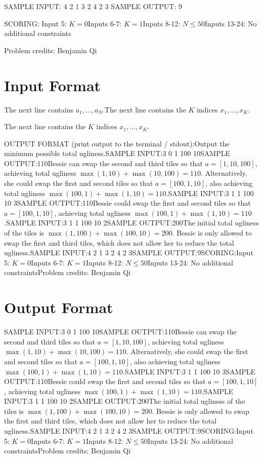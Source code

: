 \documentclass[12pt]{article}
\begin{document}
SAMPLE INPUT:
4 2
1 3 2 4
2 3
SAMPLE OUTPUT: 
9

SCORING:
Input 5: $K=0$Inputs 6-7: $K=1$Inputs 8-12: $N\le 50$Inputs 13-24: No additional constraints

Problem credits: Benjamin Qi



\section*{Input Format}
The next line contains $a_1,\dots,a_N$.The next line contains the $K$ indices $x_1,\dots,x_K$.

The next line contains the $K$ indices $x_1,\dots,x_K$.

OUTPUT FORMAT (print output to the terminal / stdout):Output the minimum possible total ugliness.SAMPLE INPUT:3 0
1 100 10SAMPLE OUTPUT:110Bessie can swap the second and third tiles so that $a=[1,10,100]$, achieving
total ugliness $\max(1,10)+\max(10,100)=110$. Alternatively, she could swap the
first and second tiles so that $a=[100,1,10]$, also achieving  total ugliness
$\max(100,1)+\max(1,10)=110$.SAMPLE INPUT:3 1
1 100 10
3SAMPLE OUTPUT:110Bessie could swap the first and second tiles so that $a=[100,1,10]$, achieving 
total ugliness $\max(100,1)+\max(1,10)=110$.SAMPLE INPUT:3 1
1 100 10
2SAMPLE OUTPUT:200The initial total ugliness of the tiles is $\max(1,100)+\max(100,10)=200$.
Bessie is only allowed to swap the first and third tiles, which does not allow
her to reduce the total ugliness.SAMPLE INPUT:4 2
1 3 2 4
2 3SAMPLE OUTPUT:9SCORING:Input 5: $K=0$Inputs 6-7: $K=1$Inputs 8-12: $N\le 50$Inputs 13-24: No additional constraintsProblem credits: Benjamin Qi

\section*{Output Format}
SAMPLE INPUT:3 0
1 100 10SAMPLE OUTPUT:110Bessie can swap the second and third tiles so that $a=[1,10,100]$, achieving
total ugliness $\max(1,10)+\max(10,100)=110$. Alternatively, she could swap the
first and second tiles so that $a=[100,1,10]$, also achieving  total ugliness
$\max(100,1)+\max(1,10)=110$.SAMPLE INPUT:3 1
1 100 10
3SAMPLE OUTPUT:110Bessie could swap the first and second tiles so that $a=[100,1,10]$, achieving 
total ugliness $\max(100,1)+\max(1,10)=110$.SAMPLE INPUT:3 1
1 100 10
2SAMPLE OUTPUT:200The initial total ugliness of the tiles is $\max(1,100)+\max(100,10)=200$.
Bessie is only allowed to swap the first and third tiles, which does not allow
her to reduce the total ugliness.SAMPLE INPUT:4 2
1 3 2 4
2 3SAMPLE OUTPUT:9SCORING:Input 5: $K=0$Inputs 6-7: $K=1$Inputs 8-12: $N\le 50$Inputs 13-24: No additional constraintsProblem credits: Benjamin Qi
\end{document}
